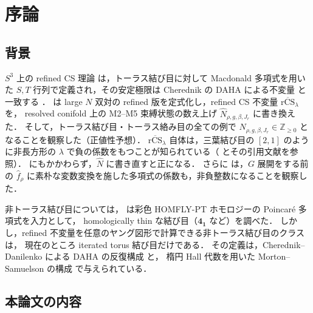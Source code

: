 \documentclass[11pt,a4paper]{ltjsarticle}
\theoremstyle{definition}
\theoremstyle{remark}
\newcommand{\rCS}{\overline{\mathrm{rCS}}}
\newcommand{\hN}{\widehat{N}}
\newcommand{\hf}{\widehat{f}}
\begin{document}
\tableofcontents

\section{序論}

\subsection{背景}

$S^3$ 上の refined CS 理論 \cite{AS,AS2} は，トーラス結び目に対して
Macdonald 多項式を用いた $S,T$ 行列で定義され，その安定極限は Cherednik の DAHA による不変量 \cite{Ch} と一致する \cite{GN}．
\cite{KN} は large $N$ 双対の refined 版を定式化し，refined CS 不変量 $\rCS_\lambda$ を，
resolved conifold 上の M2--M5 束縛状態の数え上げ $\hN_{\rho,g,\beta,J_r}$ に書き換えた．
そして，トーラス結び目・トーラス絡み目の全ての例で $\hN_{\rho,g,\beta,J_r}\in\mathbb{Z}_{\ge0}$ となることを観察した（正値性予想）．
$\rCS_\lambda$ 自体は，三葉結び目の $[2,1]$ のように非長方形の $\lambda$ で負の係数をもつことが知られている（\cite{KN} とその引用文献を参照）．
にもかかわらず，$\hN$ に書き直すと正になる．
さらに \cite{KN} は，$G$ 展開をする前の $\hf_\rho$ に素朴な変数変換を施した多項式の係数も，非負整数になることを観察した．

非トーラス結び目については，\cite{KN} は彩色 HOMFLY-PT ホモロジーの Poincaré 多項式を入力として，
homologically thin な結び目（$\mathbf{4_1}$ など）を調べた．
しかし，refined 不変量を任意のヤング図形で計算できる非トーラス結び目のクラスは，
現在のところ iterated torus 結び目だけである．
その定義は，Cherednik--Danilenko による DAHA の反復構成 \cite{CD14,CD15} と，
楕円 Hall 代数を用いた Morton--Samuelson の構成 \cite{MS} で与えられている．

\subsection{本論文の内容}
\end{document}
